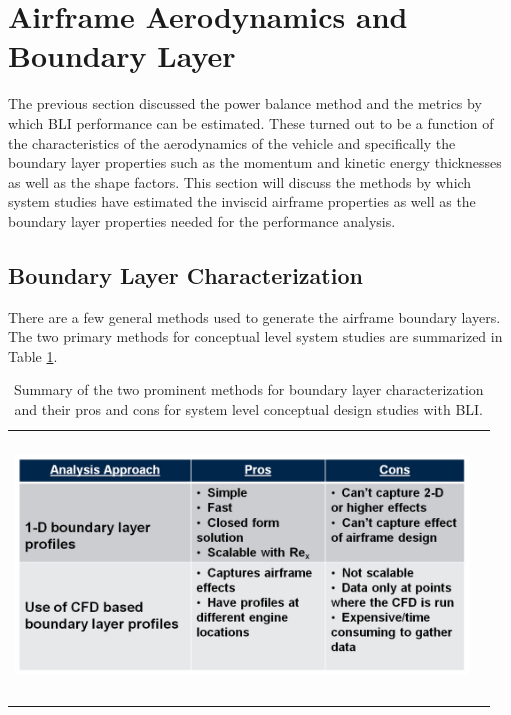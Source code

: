 \documentclass[12pt]{gatech-thesis}
\begin{document}

\section{Airframe Aerodynamics and Boundary Layer}

The previous section discussed the power balance method and the metrics by which BLI performance can be estimated.  These turned out to be a function of the characteristics of the aerodynamics of the vehicle and specifically the boundary layer properties such as the momentum and kinetic energy thicknesses as well as the shape factors.  This section will discuss the methods by which system studies have estimated the inviscid airframe properties as well as the boundary layer properties needed for the performance analysis.

\subsection{Boundary Layer Characterization}
\indent There are a few general methods used to generate the airframe boundary layers.  The two primary methods for conceptual level system studies are summarized in Table \ref{Methods_Airframe}.  

\begin{table}[ht]
\caption{Summary of the two prominent methods for boundary layer characterization and their pros and cons for system level conceptual design studies with BLI.}
\centering
\begin{tabular}{cc}
\includegraphics[width=120mm, height =70mm, clip=true]{Figure7_Methods_Airframe.png}
\end{tabular}
\label{Methods_Airframe}
\end{table}
\end{document}
